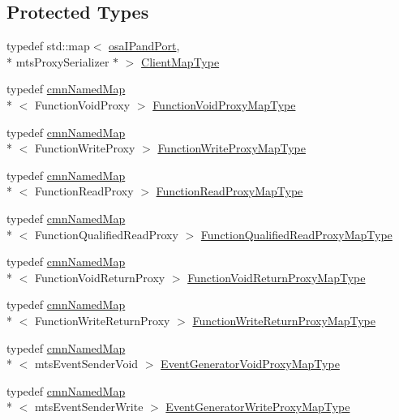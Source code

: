 \subsection*{Protected Types}
\begin{DoxyCompactItemize}
\item 
typedef std\-::map$<$ \hyperlink{structosa_i_pand_port}{osa\-I\-Pand\-Port}, \\*
mts\-Proxy\-Serializer $\ast$ $>$ \hyperlink{classmts_socket_proxy_server_a7119b8c41d2a72f7234f77bdcc1e2fad}{Client\-Map\-Type}
\item 
typedef \hyperlink{classcmn_named_map}{cmn\-Named\-Map}\\*
$<$ Function\-Void\-Proxy $>$ \hyperlink{classmts_socket_proxy_server_a6d95a7cca6e51f877454df35d3fa56ab}{Function\-Void\-Proxy\-Map\-Type}
\item 
typedef \hyperlink{classcmn_named_map}{cmn\-Named\-Map}\\*
$<$ Function\-Write\-Proxy $>$ \hyperlink{classmts_socket_proxy_server_ae84115470284d069bbd2856f4fa11e43}{Function\-Write\-Proxy\-Map\-Type}
\item 
typedef \hyperlink{classcmn_named_map}{cmn\-Named\-Map}\\*
$<$ Function\-Read\-Proxy $>$ \hyperlink{classmts_socket_proxy_server_ac02122bd068b3dc59511a47e2e733671}{Function\-Read\-Proxy\-Map\-Type}
\item 
typedef \hyperlink{classcmn_named_map}{cmn\-Named\-Map}\\*
$<$ Function\-Qualified\-Read\-Proxy $>$ \hyperlink{classmts_socket_proxy_server_ad42c455d343f85b06a2c7047739c9c7b}{Function\-Qualified\-Read\-Proxy\-Map\-Type}
\item 
typedef \hyperlink{classcmn_named_map}{cmn\-Named\-Map}\\*
$<$ Function\-Void\-Return\-Proxy $>$ \hyperlink{classmts_socket_proxy_server_a542c0cd156add7e963c92287aaf4e7f3}{Function\-Void\-Return\-Proxy\-Map\-Type}
\item 
typedef \hyperlink{classcmn_named_map}{cmn\-Named\-Map}\\*
$<$ Function\-Write\-Return\-Proxy $>$ \hyperlink{classmts_socket_proxy_server_ab8976dbfc7fa5afbb1f02e7cddc2d71d}{Function\-Write\-Return\-Proxy\-Map\-Type}
\item 
typedef \hyperlink{classcmn_named_map}{cmn\-Named\-Map}\\*
$<$ mts\-Event\-Sender\-Void $>$ \hyperlink{classmts_socket_proxy_server_ae784ef6005901f988064e99f28bc4dc4}{Event\-Generator\-Void\-Proxy\-Map\-Type}
\item 
typedef \hyperlink{classcmn_named_map}{cmn\-Named\-Map}\\*
$<$ mts\-Event\-Sender\-Write $>$ \hyperlink{classmts_socket_proxy_server_a54071862784d4a4b6b75588e5c03df14}{Event\-Generator\-Write\-Proxy\-Map\-Type}
\end{DoxyCompactItemize}
